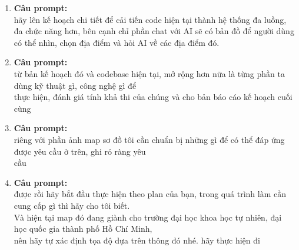\begin{enumerate}
Người dùng đi tới mỗi điểm sẽ “check-in” bằng GPS hoặc quét ảnh để nhận stamp. Cuối chuyến có bộ sưu tập 17 dấu mộc, tiến độ, điểm đã đi, thời gian đã nghe. Cảm giác rất rõ: app biến chuyến đi thành hành trình có thành tựu. \\
\* Nhật ký sau chuyến đi \\

Sau khi tham quan, app tự tạo “Kỷ niệm chuyến đi Đại Nội”: các điểm đã ghé, ảnh đã chụp, câu hỏi     đã hỏi AI, audio đã nghe, bản đồ lộ trình. Có nút xuất ảnh/poster chia sẻ. \\

Với yêu cầu: Không được hard code \\


\item \textbf{Câu prompt:} \\
\* hãy lên kế hoạch chi tiết để cải tiến code hiện tại thành hệ thống đa luồng, đa chức năng hơn, bên cạnh chỉ phần chat với AI sẽ có bản đồ để người dùng có thể nhìn, chọn địa điểm và hỏi AI về các địa điểm đó. \\



\item \textbf{Câu prompt:} \\
\* từ bản kế hoạch đó và codebase hiện tại, mở rộng hơn nữa là từng phần ta dùng kỹ thuật gì, công nghệ gì để \\

 thực hiện, đánh giá tính khả thi của chúng và cho bản báo cáo kế hoạch cuối cùng \\


\item \textbf{Câu prompt:} \\
\* riêng với phần ảnh map sơ đồ tôi cần chuẩn bị những gì để có thể đáp ứng được yêu cầu ở trên, ghi rỏ ràng yêu \\
       cầu \\



\item \textbf{Câu prompt:} \\
\* được rồi hãy bắt đầu thực hiện theo plan của bạn, trong quá trình làm cần cung cấp gì thì hãy cho tôi biết. \\
       Và hiện tại map đó đang giành cho trường đại học khoa học tự nhiên, đại học quốc gia thành phố Hồ Chí Minh, \\
       nên hãy tự xác định tọa độ dựa trên thông đó nhé. hãy thực hiện đi \\




\end{enumerate}
